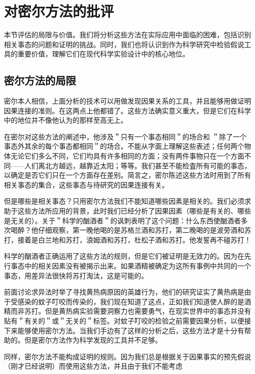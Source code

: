 \section{对密尔方法的批评}

\begin{logicbox}[title=引言]
本节评估的局限与价值。我们将分析这些方法在实际应用中面临的困难，包括识别相关事态的问题和证明的挑战。同时，我们也将认识到作为科学研究中检验假说工具的重要价值，理解它们在现代科学实验设计中的核心地位。
\end{logicbox}

\subsection{密尔方法的局限}
密尔本人相信，上面分析的技术可以用做发现因果关系的工具，并且能够用做证明因果连接的准则。在这两点上他都错了。这些方法确实意义重大，但是它们在科学中的地位并不像他认为的那样至高无上。

在密尔对这些方法的阐述中，他涉及＂只有一个事态相同＂的场合和 ＂除了一个事态外其余的每个事态都相同＂的场合。不能从字面上理解这些表述；任何两个物体无论它们多么不同，它们均具有许多相同的方面；没有两件事物只在一个方面不同——人们离北方越远，越靠近太阳；等等。我们甚至不能检査所有可能的事态，以确定是否它们只在一个方面存在差别。简言之，密尔陈述这些方法时用到了所有相关事态的集合，这些事态与待研究的因果连接有关。

但是哪些是相关事态？只用密尔方法我们不能知道哪些因素是相关的。我们必须求助于这些方法所应用的背景，此时我们已经分析了因果因素（哪些是有关的、哪些是无关的）。关于＂科学的酗酒者＂的讽刺表明了这个问题：什么东西使酗酒者多次喝醉？他仔细观察，第一晚他喝的是苏格兰酒和苏打，第二晚喝的是波旁酒和苏打，接着是白兰地和苏打，浪姆酒和苏打，杜松子酒和苏打。他发誓再不碰苏打！

科学的酗酒者正确运用了这些方法的规则，但是它们被证明是无效力的。因为在先行事态中的相关因素没有被揭示出来。如果酒精被确定为这所有事例中共同的一个事态，用差异法很快将苏打淘汰，这是可能的。

前面讨论求异法时举了寻找黄热病原因的英雄行为，他们的研究证实了黄热病是由于受感染的蚊子叮咬而传染的，我们现在知道了这点，正如我们知道使人醉的是酒精而非苏打。但是黄热病实验需要洞察力也需要勇气，在现实世界中的事态并没有贴有＂有关的＂或＂无关的＂标签。对蚊子叮咬的检验之前需要因果分析，以便接下来能够使用密尔方法。当我们手边有了这样的分析之后，这些方法才是十分有帮助的。但是密尔方法作为科学发现的工具并不足够。

同样，密尔方法不能构成证明的规则。因为我们总是根据关于因果事实的预先假说（刚才已经说明）而使用这些方法，并且由于我们不能考虑

